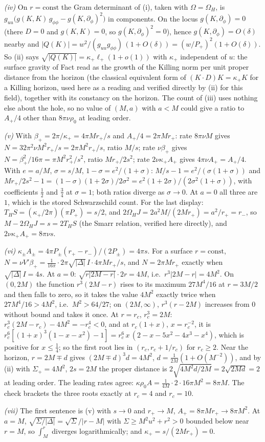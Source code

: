 \emph{(iv)} On $r = \mathrm{const}$ the Gram determinant of (i), taken with $\Omega = \Omega_H$, is $g_{uu}\bigl(g(K,K)\,g_{\phi\phi} - g(K,\partial_\phi)^2\bigr)$ in components. On the locus $g(K, \partial_\phi) = 0$ (there $D = 0$ and $g(K,K) = 0$, so $g(K,\partial_\phi)^2 = 0$), hence $g(K,\partial_\phi) = O(\delta)$ nearby and $|Q(K)| = w^2/(g_{uu}g_{\phi\phi})\,(1 + O(\delta)) = (w/P_+)^2(1 + O(\delta))$. So (ii) says $\sqrt{|Q(K)|} = \kappa_+\ell_+(1 + o(1))$ with $\kappa_+$ independent of $u$: the surface gravity of Fact  read as the growth of the Killing norm per unit proper distance from the horizon (the classical equivalent form of $(K\cdot D)K = \kappa_+K$ for a Killing horizon, used here as a reading and verified directly by (ii) for this field), together with its constancy on the horizon. The count of (iii) uses nothing else about the hole, so no value of $(M, a)$ with $a < M$ could give a ratio to $A_+/4$ other than $8\pi\nu\rho_0$ at leading order.

\emph{(v)} With $\beta_+ = 2\pi/\kappa_+ = 4\pi Mr_+/s$ and $A_+/4 = 2\pi Mr_+$: rate $8\pi\nu M$ gives $N = 32\pi^2\nu M^2r_+/s = 2\pi M^2r_+/s$, ratio $M/s$; rate $\nu\beta_+$ gives $N = \beta_+^2/16\pi = \pi M^2r_+^2/s^2$, ratio $Mr_+/2s^2$; rate $2\nu\kappa_+A_+$ gives $4\pi\nu A_+ = A_+/4$. With $e = a/M$, $\sigma = s/M$, $1 - \sigma = e^2/(1+\sigma)$: $M/s - 1 = e^2/(\sigma(1+\sigma))$ and $Mr_+/2s^2 - 1 = (1-\sigma)(1+2\sigma)/2\sigma^2 = e^2(1+2\sigma)/(2\sigma^2(1+\sigma))$, with coefficients $\tfrac12$ and $\tfrac34$ at $\sigma = 1$; both ratios diverge as $\sigma \to 0$. At $a = 0$ all three are $1$, which is the stored Schwarzschild count. For the last display: $T_HS = (\kappa_+/2\pi)(\pi P_+) = s/2$, and $2\Omega_HJ = 2a^2M/(2Mr_+) = a^2/r_+ = r_-$, so $M - 2\Omega_HJ = s = 2T_HS$ (the Smarr relation, verified here directly), and $2\nu\kappa_+A_+ = 8\pi\nu s$.

\emph{(vi)} $\kappa_\pm A_\pm = 4\pi P_\pm(r_+ - r_-)/(2P_\pm) = 4\pi s$. For a surface $r = \mathrm{const}$, $N = \nu V'\beta_+ = \tfrac{1}{16\pi}\cdot2\pi\sqrt{|\Delta|}\,I\cdot4\pi Mr_+/s$, and $N = 2\pi Mr_+$ exactly when $\sqrt{|\Delta|}\,I = 4s$. At $a = 0$: $\sqrt{r|2M - r|}\cdot2r = 4M$, i.e.\ $r^3|2M - r| = 4M^2$. On $(0, 2M)$ the function $r^3(2M - r)$ rises to its maximum $27M^4/16$ at $r = 3M/2$ and then falls to zero, so it takes the value $4M^2$ exactly twice when $27M^4/16 > 4M^2$, i.e.\ $M^2 > 64/27$; on $(2M, \infty)$, $r^3(r - 2M)$ increases from $0$ without bound and takes it once. At $r = r_c$, $r_c^3 = 2M$: $r_c^3(2M - r_c) - 4M^2 = -r_c^4 < 0$, and at $r_c(1 + x)$, $x = r_c^{-2}$, it is $r_c^6[(1+x)^3(1 - x - x^2) - 1] = r_c^6\,x\,(2 - x - 5x^2 - 4x^3 - x^4)$, which is positive for $x \le \tfrac14$; so the first root lies in $(r_c, r_c + 1/r_c)$ for $r_c \ge 2$. Near the horizon, $r = 2M \mp d$ gives $(2M \mp d)^3d = 4M^2$, $d = \tfrac{1}{2M}(1 + O(M^{-2}))$, and by (ii) with $\Sigma_+ = 4M^2$, $2s = 2M$ the proper distance is $2\sqrt{4M^2d/2M} = 2\sqrt{2Md} = 2$ at leading order. The leading rates agree: $\kappa\rho_0A = \tfrac{1}{4M}\cdot2\cdot16\pi M^2 = 8\pi M$. The check brackets the three roots exactly at $r_c = 4$ and $r_c = 10$.

\emph{(vii)} The first sentence is (v) with $s \to 0$ and $r_+ \to M$, $A_+ = 8\pi Mr_+ \to 8\pi M^2$. At $a = M$, $\sqrt{\Sigma/|\Delta|} = \sqrt{\Sigma}/|r - M|$ with $\Sigma \ge M^2u^2 + r^2 > 0$ bounded below near $r = M$, so $\int_M^r$ diverges logarithmically; and $\kappa_+ = s/(2Mr_+) = 0$.
